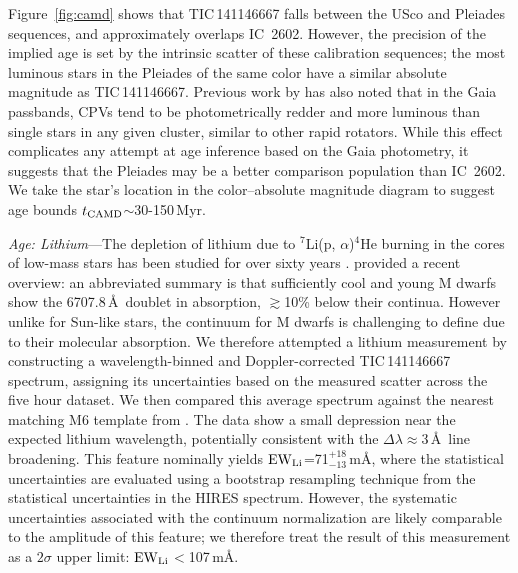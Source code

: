 \documentclass[11pt,twocolumn,tighten,linenumbers]{aastex7}
\begin{document}
Figure~\ref{fig:camd} shows that TIC\,141146667 falls
between the USco and Pleiades sequences, and approximately overlaps
IC~2602.  However, the precision of the implied age is set by the
intrinsic scatter of these calibration sequences; the most luminous
stars in the Pleiades of the same color have a similar absolute
magnitude as TIC\,141146667.  Previous work by \citet{Stauffer2021} has
also noted that in the Gaia passbands, CPVs tend to be photometrically
redder and more luminous than single stars in any given cluster,
similar to other rapid rotators.  While this effect complicates any
attempt at age inference based on the Gaia photometry, it suggests
that the Pleiades may be a better comparison population than IC~2602.
We take the star's location in the color--absolute magnitude diagram
to suggest age bounds $t_{\rm CAMD}$$\sim$30-150\,Myr.


{\it Age: Lithium}---The depletion of lithium due to $^7$Li(p,
$\alpha$)$^4$He burning in the cores of low-mass stars has been
studied for over sixty years
\citep{Hayashi1963,Bildsten1997,Burke2004}.  \citet{Wood2023} provided a
recent overview: an abbreviated summary is that sufficiently cool and
young M dwarfs show the 6707.8\,\AA\ doublet in absorption,
$\gtrsim$10\% below their continua.  However unlike for Sun-like
stars, the continuum for M dwarfs is challenging to define due to
their molecular absorption.  We therefore attempted a lithium
measurement by constructing a wavelength-binned and Doppler-corrected
TIC\,141146667 spectrum, assigning its uncertainties based on the
measured scatter across the five hour dataset.  We then compared this
average spectrum against the nearest matching M6 template from
\citet{Bochanski2007}.  The data show a small depression near the
expected lithium wavelength, potentially consistent with the $\Delta
\lambda$$\approx$3\,\AA\ line broadening.  This feature nominally
yields ${\rm EW}_{\rm Li}$=71$^{+18}_{-13}$\,m\AA, where the
statistical uncertainties are evaluated using a bootstrap resampling
technique from the statistical uncertainties in the HIRES spectrum.
However, the systematic uncertainties associated with the continuum
normalization are likely comparable to the amplitude of this feature;
we therefore treat the result of this measurement as a $2\sigma$ upper
limit: ${\rm EW}_{\rm Li}$$<$107\,m\AA.
\end{document}
